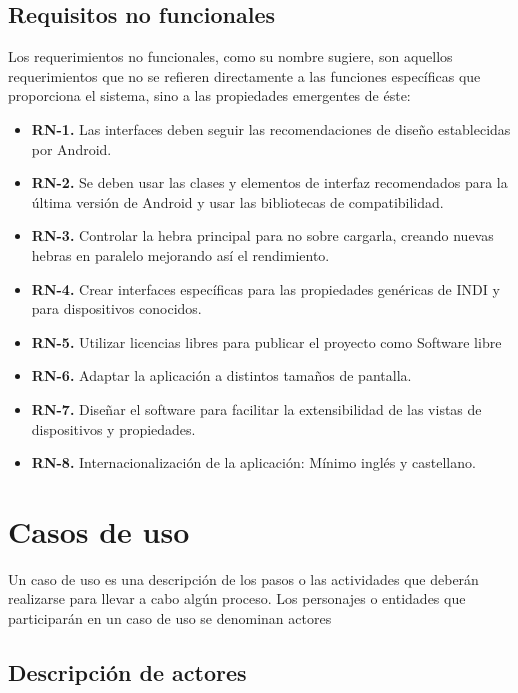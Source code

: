 \subsection{Requisitos no funcionales}

Los requerimientos no funcionales, como su nombre sugiere, son aquellos requerimientos que no se refieren directamente a las funciones específicas que proporciona el sistema, sino a las propiedades emergentes de éste:

\begin{itemize}
  \item \textbf{RN-1.} Las interfaces deben seguir las recomendaciones de diseño establecidas por Android.
  \item \textbf{RN-2.} Se deben usar las clases y elementos de interfaz recomendados para la última versión de Android y usar las bibliotecas de compatibilidad.
  \item \textbf{RN-3.} Controlar la hebra principal para no sobre cargarla, creando nuevas hebras en paralelo mejorando así el rendimiento.
  \item \textbf{RN-4.} Crear interfaces específicas para las propiedades genéricas de INDI y para dispositivos conocidos.
  \item \textbf{RN-5.} Utilizar licencias libres para publicar el proyecto como Software libre
  \item \textbf{RN-6.} Adaptar la aplicación a distintos tamaños de pantalla.
  \item \textbf{RN-7.} Diseñar el software para facilitar la extensibilidad de las vistas de dispositivos y propiedades.
  \item \textbf{RN-8.} Internacionalización de la aplicación: Mínimo inglés y castellano.
\end{itemize}

\section{Casos de uso}

Un caso de uso es una descripción de los pasos o las actividades que deberán realizarse para llevar a cabo algún proceso. Los personajes o entidades que participarán en un caso de uso se denominan actores

\subsection{Descripción de actores}

